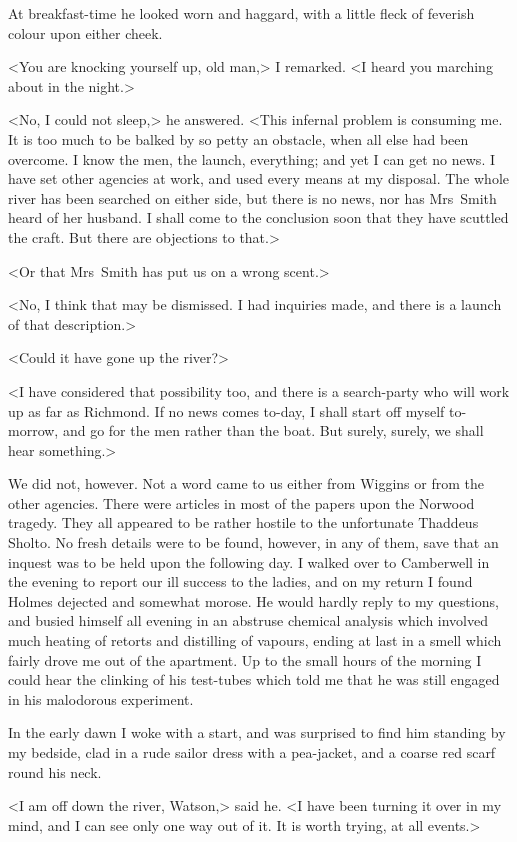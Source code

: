 At breakfast-time he looked worn and haggard, with a little fleck of feverish colour upon either cheek.

<You are knocking yourself up, old man,> I remarked. <I heard you marching about in the night.>

<No, I could not sleep,> he answered. <This infernal problem is consuming me. It is too much to be balked by so petty an obstacle, when all else had been overcome. I know the men, the launch, everything; and yet I can get no news. I have set other agencies at work, and used every means at my disposal. The whole river has been searched on either side, but there is no news, nor has Mrs~Smith heard of her husband. I shall come to the conclusion soon that they have scuttled the craft. But there are objections to that.>

<Or that Mrs~Smith has put us on a wrong scent.>

<No, I think that may be dismissed. I had inquiries made, and there is a launch of that description.>

<Could it have gone up the river?>

<I have considered that possibility too, and there is a search-party who will work up as far as Richmond. If no news comes to-day, I shall start off myself to-morrow, and go for the men rather than the boat. But surely, surely, we shall hear something.>

We did not, however. Not a word came to us either from Wiggins or from the other agencies. There were articles in most of the papers upon the Norwood tragedy. They all appeared to be rather hostile to the unfortunate Thaddeus Sholto. No fresh details were to be found, however, in any of them, save that an inquest was to be held upon the following day. I walked over to Camberwell in the evening to report our ill success to the ladies, and on my return I found Holmes dejected and somewhat morose. He would hardly reply to my questions, and busied himself all evening in an abstruse chemical analysis which involved much heating of retorts and distilling of vapours, ending at last in a smell which fairly drove me out of the apartment. Up to the small hours of the morning I could hear the clinking of his test-tubes which told me that he was still engaged in his malodorous experiment.

In the early dawn I woke with a start, and was surprised to find him standing by my bedside, clad in a rude sailor dress with a pea-jacket, and a coarse red scarf round his neck.

<I am off down the river, Watson,> said he. <I have been turning it over in my mind, and I can see only one way out of it. It is worth trying, at all events.>

